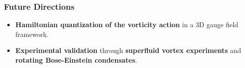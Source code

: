     \subsubsection*{Future Directions}
    \begin{itemize}
        \item \textbf{Hamiltonian quantization of the vorticity action} in a 3D gauge field framework.
        \item \textbf{Experimental validation} through \textbf{superfluid vortex experiments} and \textbf{rotating Bose-Einstein condensates}.
    \end{itemize}
    

